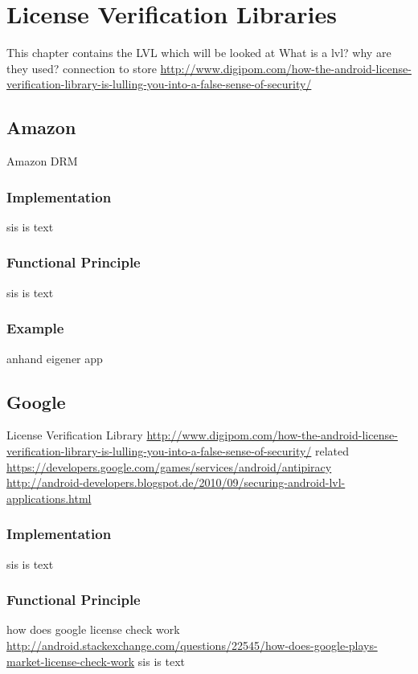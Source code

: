 \section{License Verification Libraries}\label{section:lvl}
This chapter contains the LVL which will be looked at\newline
What is a lvl? why are they used? connection to store\newline
\url{http://www.digipom.com/how-the-android-license-verification-library-is-lulling-you-into-a-false-sense-of-security/}\newline

\subsection{Amazon}\label{subsection:lvl-amazon}
Amazon DRM
\subsubsection{Implementation}\label{subsection:lvl-amazon-implementation}
sis is text
\subsubsection{Functional Principle}\label{subsection:lvl-amazon-functional}
sis is text
\subsubsection{Example}\label{subsection:lvl-amazon-example}
anhand eigener app
\subsection{Google}\label{subsection:lvl-google}
License Verification Library\newline
\url{http://www.digipom.com/how-the-android-license-verification-library-is-lulling-you-into-a-false-sense-of-security/}\newline
related \url{https://developers.google.com/games/services/android/antipiracy}\newline
\url{http://android-developers.blogspot.de/2010/09/securing-android-lvl-applications.html}\newline
\subsubsection{Implementation}\label{subsection:lvl-google-implementation}
sis is text
\subsubsection{Functional Principle}\label{subsection:lvl-google-functional}
how does google license check work \url{http://android.stackexchange.com/questions/22545/how-does-google-plays-market-license-check-work}\newline
sis is text
